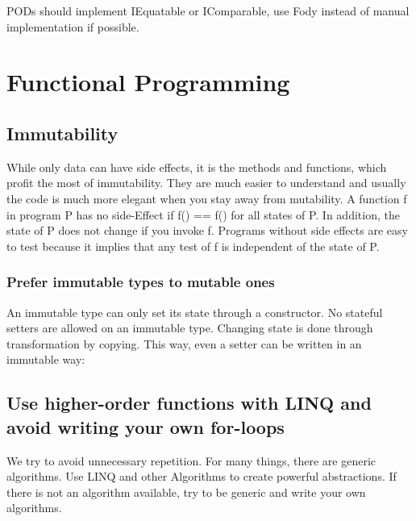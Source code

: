 \documentclass[11pt,a4paper]{article}
\begin{document}
PODs should implement IEquatable or IComparable, use Fody instead of manual implementation if possible.

\section{Functional Programming}

\subsection{Immutability}

While only data can have side effects, it is the methods and functions, which profit the most of immutability. They are much easier to understand and usually the code is much more elegant when you stay away from mutability. A function f in program P has no side-Effect if f() == f() for all states of P. In addition, the state of P does not change if you invoke f.
Programs without side effects are easy to test because it implies that any test of f is independent of the state of P.

\subsubsection{Prefer immutable types to mutable ones}

An immutable type can only set its state through a constructor. No stateful setters are allowed on an immutable type. Changing state is done through transformation by copying. This way, even a setter can be written in an immutable way:


\subsection{Use higher-order functions with LINQ and avoid writing your own for-loops}

We try to avoid unnecessary repetition. For many things, there are generic algorithms. Use LINQ and other Algorithms to create powerful abstractions.
If there is not an algorithm available, try to be generic and write your own algorithms.
\end{document}
